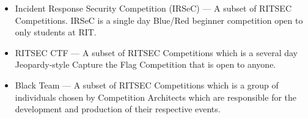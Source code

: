 \begin{itemize}
      \item Incident Response Security Competition (IRSeC) --- A subset of RITSEC
            Competitions. IRSeC is a single day Blue/Red beginner competition open to only
            students at RIT.

      \item RITSEC CTF --- A subset of RITSEC Competitions which is a several day
            Jeopardy-style Capture the Flag Competition that is open to anyone.

      \item Black Team --- A subset of RITSEC Competitions which is a group of individuals
            chosen by Competition Architects which are responsible for the development and
            production of their respective events.

\end{itemize}